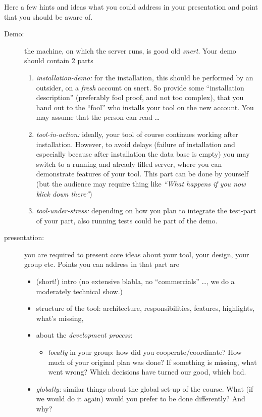 \documentclass[11pt,handout]{handout}
\begin{document}
Here a few hints and ideas what you could address in your presentation and
point that you should be aware of.

\begin{description}
\item[Demo:] the machine, on which the server runs, is good old
  \emph{snert}. Your demo should contain 2 parts
  \begin{enumerate}
  \item \emph{installation-demo:} for the installation, this should be
    performed by an outsider, on a \emph{fresh} account on snert. So
    provide some ``installation description'' (preferably fool proof, and
    not too complex), that you hand out to the ``fool'' who installs your
    tool on the new account. You may assume that the person can read \ldots
  \item \emph{tool-in-action:} ideally, your tool of course continues
    working after installation. However, to avoid delays (failure of
    installation and especially because after installation the data base is
    empty) you may switch to a running and already filled server, where you
    can demonstrate features of your tool. This part can be done by yourself
    (but the audience may require thing like \emph{``What happens if you
      now klick down there''})
  \item \emph{tool-under-stress:} depending on how you plan to integrate
    the test-part of your part, also running tests could be part of the
    demo.
  \end{enumerate}
\item[presentation:] you are required to present core ideas about your
  tool, your design, your group etc. Points you can address in that part are
  \begin{itemize}
  \item (short!) intro (no extensive blabla, no ``commercials'' \ldots, we
    do a moderately technical show.)
  \item structure of the tool: architecture, responsibilities, features,
    highlights, what's missing,
  \item about the \emph{development process}:
    \begin{itemize}
    \item \emph{locally} in your group: how did you cooperate/coordinate?
      How much of your original plan was done? If something is missing,
      what went wrong? Which decisions have turned our good, which bad.
    \end{itemize}
  \item \emph{globally:} similar things about the global set-up of the
    course. What (if we would do it again) would you prefer to be done
    differently? And why?
  \end{itemize}
\end{description}
\end{document}
